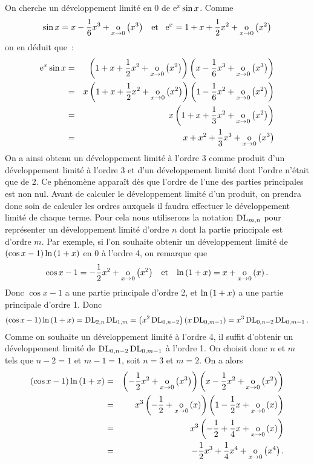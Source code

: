 \documentclass{magnolia}
\begin{document}
\begin{remarqueUnique}
\item On cherche un développement limité en 0 de ${\rm e}^x\sin x$. Comme
  \[\sin x=x-\frac{1}{6}x^3+\underset{x \rightarrow 0}{\text{o}}\left(x^3\right) \quad\!\text{et}\quad\!
    {\rm e}^x=1+x+\frac{1}{2}x^2+\underset{x \rightarrow 0}{\text{o}}\left(x^2\right)\]
  on en déduit que~:
  \begin{eqnarray*}
  {\rm e}^x\sin x
  &=& \left(1+x+\frac{1}{2}x^2+\underset{x \rightarrow 0}{\text{o}}\left(x^2\right)\right)
      \left(x-\frac{1}{6}x^3+\underset{x \rightarrow 0}{\text{o}}\left(x^3\right)\right)\\
  &=& x\left(1+x+\frac{1}{2}x^2+\underset{x \rightarrow 0}{\text{o}}\left(x^2\right)\right)
       \left(1-\frac{1}{6}x^2+\underset{x \rightarrow 0}{\text{o}}\left(x^2\right)\right)\\
  &=& x\left(1+x+\frac{1}{3}x^2+\underset{x \rightarrow 0}{\text{o}}\left(x^2\right)\right)\\
  &=& x+x^2+\frac{1}{3}x^3+\underset{x \rightarrow 0}{\text{o}}\left(x^3\right)
  \end{eqnarray*}
  On a ainsi obtenu un développement limité à l'ordre 3 comme produit d'un
  développement limité à l'ordre 3 et d'un développement limité dont l'ordre
  n'était que de 2.
  Ce phénomène apparaît dès que l'ordre de l'une des parties principales est
  non nul. Avant de calculer le développement limité d'un produit, on prendra
  donc soin de calculer les ordres auxquels il faudra effectuer le développement
  limité de chaque terme. Pour cela  nous utiliserons la notation $\operatorname{DL}_{m,n}$
  pour représenter un développement limité d'ordre $n$ dont la partie
  principale est d'ordre $m$. Par exemple, si l'on souhaite obtenir
  un développement limité de $\left(\cos x-1\right)\ln\left(1+x\right)$ en 0 à l'ordre 4, on
  remarque que
  \[\cos x-1=-\frac{1}{2}x^2+\underset{x \rightarrow 0}{\text{o}}\left(x^2\right) \quad\!\text{et}\quad\!
    \ln\left(1+x\right)=x+\underset{x \rightarrow 0}{\text{o}}\left(x\right).\]
  Donc $\cos x-1$ a une partie principale d'ordre 2, et $\ln\left(1+x\right)$ a une
  partie principale d'ordre 1. Donc
  \[\left(\cos x-1\right)\ln\left(1+x\right)=\operatorname{DL}_{2,n}\operatorname{DL}_{1,m}=\left(x^2\operatorname{DL}_{0,n-2}\right)\left(x\operatorname{DL}_{0,m-1}\right)=
    x^3 \operatorname{DL}_{0,n-2}\operatorname{DL}_{0,m-1}.\]
  Comme on souhaite un développement limité à l'ordre 4, il suffit d'obtenir un
  développement limité de $\operatorname{DL}_{0,n-2}\operatorname{DL}_{0,m-1}$ à l'ordre 1. On choisit donc
  $n$ et $m$ tels que $n-2=1$ et $m-1=1$, soit $n=3$ et $m=2$. On a alors
  \begin{eqnarray*}
  \left(\cos x-1\right)\ln\left(1+x\right)
  &=& \left(-\frac{1}{2}x^2+\underset{x \rightarrow 0}{\text{o}}\left(x^3\right)\right)
      \left(x-\frac{1}{2}x^2+\underset{x \rightarrow 0}{\text{o}}\left(x^2\right)\right)\\
  &=& x^3\left(-\frac{1}{2}+\underset{x \rightarrow 0}{\text{o}}\left(x\right)\right)\left(1-\frac{1}{2}x+\underset{x \rightarrow 0}{\text{o}}\left(x\right)\right)\\
  &=& x^3\left(-\frac{1}{2}+\frac{1}{4}x+\underset{x \rightarrow 0}{\text{o}}\left(x\right)\right)\\
  &=& -\frac{1}{2}x^3+\frac{1}{4}x^4+\underset{x \rightarrow 0}{\text{o}}\left(x^4\right).
  \end{eqnarray*}
\end{remarqueUnique}
\end{document}
